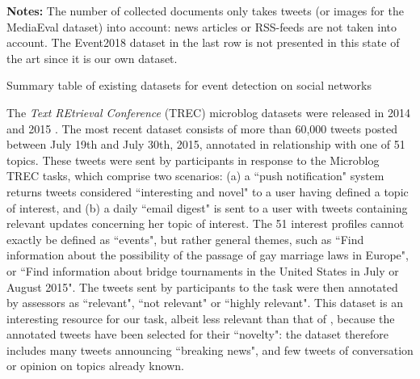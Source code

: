 \begin{table}
\begin{center}
\end{center}
\scriptsize \textbf{Notes:} The number of collected documents only takes tweets (or images for the MediaEval dataset) into account: news articles or RSS-feeds are not taken into account. The Event2018 dataset in the last row is not presented in this state of the art since it is our own dataset.
\caption{Summary table of existing datasets for event detection on social networks \label{Tab:datasets}}
\end{table}

The \textit{Text REtrieval Conference} (TREC) microblog datasets were released in 2014 \cite{lin2014overview} and 2015 \cite{lin2015overview}. The most recent dataset consists of more than 60,000 tweets posted between July 19th and July 30th, 2015, annotated in relationship with one of 51 topics. These tweets were sent by participants in response to the Microblog TREC tasks, which comprise two scenarios: (a) a ``push notification" system returns tweets considered ``interesting and novel" to a user having defined a topic of interest, and (b) a daily ``email digest" is sent to a user with tweets containing relevant updates concerning her topic of interest. The 51 interest profiles cannot exactly be defined as ``events", but rather general themes, such as ``Find information about the possibility of the passage of gay marriage laws in Europe", or ``Find information about bridge tournaments in the United States in July or August 2015". The tweets sent by participants to the task were then annotated by assessors as ``relevant", ``not relevant" or ``highly relevant". This dataset is an interesting resource for our task, albeit less relevant than that of \citet{mcminn_building_2013}, because the annotated tweets have been selected for their ``novelty": the dataset therefore includes many tweets announcing ``breaking news", and few tweets of conversation or opinion on topics already known.

